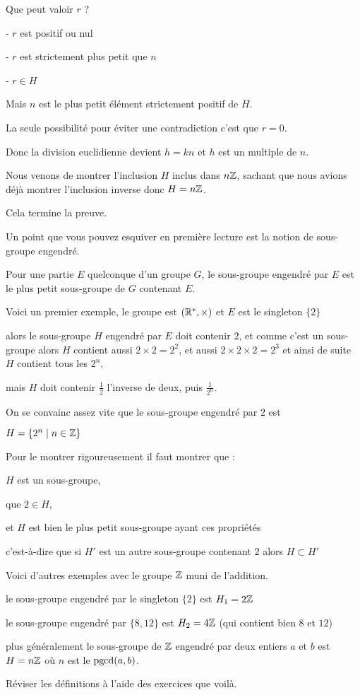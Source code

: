 Que peut valoir $r$ ?

 - $r$ est positif ou nul

 - $r$ est strictement plus petit que $n$

 - $r\in H$

Mais $n$ est le plus petit élément strictement positif de $H$.

La seule possibilité pour éviter une contradiction c'est que $r=0$.

Donc la division euclidienne devient $h=kn$ et $h$ est un multiple de $n$.

\change

Nous venons de montrer l'inclusion $H$ inclus dans $n\mathbb{Z}$,
sachant que nous avions déjà montrer l'inclusion inverse
donc $H = n\mathbb{Z}$.

Cela termine la preuve.


\diapo

Un point que vous pouvez esquiver en première lecture est la
notion de sous-groupe engendré.

Pour une partie $E$ quelconque d'un groupe $G$, le sous-groupe engendré par $E$ 
est le plus petit sous-groupe de $G$ contenant $E$.

\change

Voici un premier exemple, le groupe est $(\mathbb{R}^*,\times)$
et $E$ est le singleton  $\{2\}$ 

alors le sous-groupe $H$ engendré par $E$ doit contenir $2$,
et comme c'est un sous-groupe alors $H$ contient aussi 
$2\times 2= 2^2$, et aussi $2\times 2 \times 2 = 2^3$ et ainsi
de suite $H$ contient tous les $2^n$, 

mais $H$ doit contenir $\frac 12$ l'inverse de deux, puis $\frac 1{2^n}$.

On se convainc assez vite que le sous-groupe engendré par $2$ est 

$H = \{ 2^n \mid n \in \mathbb{Z}\}$

\change

Pour le montrer rigoureusement il faut montrer que :

 $H$ est un sous-groupe, 

que $2 \in H$, 

et $H$ est bien le plus petit sous-groupe ayant ces propriétés 

c'est-à-dire que si $H'$ est un autre sous-groupe 
contenant $2$ alors $H \subset H'$


\change

Voici d'autres exemples avec le groupe $\mathbb{Z}$ muni de l'addition.

le sous-groupe engendré par le singleton $\{2\}$ est $H_1 = 2\mathbb{Z}$

\change

le sous-groupe engendré par $\{8,12\}$ est $H_2 = 4\mathbb{Z}$ (qui contient bien $8$ et $12$)


\change
 plus généralement le sous-groupe de $\mathbb{Z}$ engendré par deux entiers
$a$ et $b$ est $H = n\mathbb{Z}$ où $n$ est le $\mathop{\mathrm{pgcd}}\nolimits(a,b)$.


\diapo

Réviser les définitions à l'aide des exercices que voilà.



